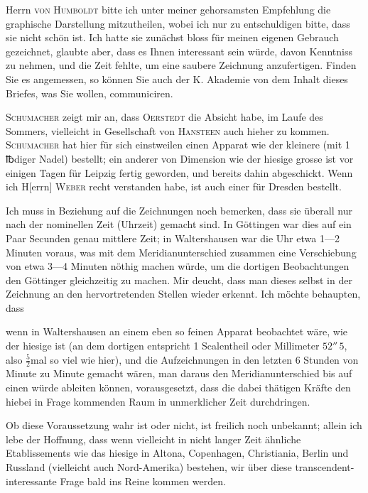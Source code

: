 Herrn \textsc{von Humboldt} bitte ich unter meiner gehorsamsten Empfehlung
die graphische Darstellung mitzutheilen, wobei ich nur zu entschuldigen bitte,
dass sie nicht schön ist. Ich hatte sie zunächst bloss für meinen eigenen Gebrauch
gezeichnet, glaubte aber, dass es Ihnen interessant sein würde, davon
\clearpage{}\HistoricalFoot{}{12\textsuperscript{*}}
\noindent Kenntniss zu nehmen, und die Zeit fehlte, um eine saubere Zeichnung anzufertigen.
Finden Sie es angemessen, so können Sie auch der K. Akademie
von dem Inhalt dieses Briefes, was Sie wollen, communiciren.

\textsc{Schumacher} zeigt mir an, dass \textsc{Oerstedt} die Absicht habe, im Laufe des
Sommers, vielleicht in Gesellschaft von \textsc{Hansteen} auch hieher zu kommen.
\textsc{Schumacher} hat hier für sich einstweilen einen Apparat wie der kleinere
(mit 1 {℔}diger Nadel) bestellt; ein anderer von  Dimension wie
der hiesige grosse ist vor einigen Tagen für Leipzig fertig geworden, und bereits
dahin abgeschickt. Wenn ich H[errn] \textsc{Weber} recht verstanden habe, ist
auch einer für Dresden bestellt.

Ich muss in Beziehung auf die Zeichnungen noch bemerken, dass sie
überall nur nach der nominellen Zeit (Uhrzeit) gemacht sind. In Göttingen
war dies auf ein Paar Secunden genau mittlere Zeit; in Waltershausen war
die Uhr etwa 1—2 Minuten voraus, was mit dem Meridianunterschied zusammen
eine Verschiebung von etwa 3—4 Minuten nöthig machen würde, um die
dortigen Beobachtungen den Göttinger gleichzeitig zu machen. Mir deucht,
dass man dieses selbst in der Zeichnung an den hervortretenden Stellen wieder
erkennt. Ich möchte behaupten, dass
\begin{list}{}{\setlength{\leftmargin}{\parindent}\setlength{\rightmargin}{0pt}\setlength{\topsep}{0pt}\setlength{\partopsep}{0pt}}
\item[] wenn in Waltershausen an einem eben so feinen Apparat beobachtet
wäre, wie der hiesige ist (an dem dortigen entspricht 1 Scalentheil oder
Millimeter \(52''\,5\), also \(\frac{5}{2}\)mal so viel wie hier), und die Aufzeichnungen in
den letzten 6 Stunden von Minute zu Minute gemacht wären, man daraus
den Meridianunterschied bis auf einen 
würde ableiten können, vorausgesetzt, dass die dabei thätigen
Kräfte den hiebei in Frage kommenden Raum in unmerklicher Zeit
durchdringen.
\end{list}
\noindent\hspace*{\parindent}Ob diese Voraussetzung wahr ist oder nicht, ist freilich noch unbekannt;
allein ich lebe der Hoffnung, dass wenn vielleicht in nicht langer Zeit ähnliche
Etablissements wie das hiesige in Altona, Copenhagen, Christiania, Berlin
und Russland (vielleicht auch Nord-Amerika) bestehen, wir über diese transcendent-interessante
Frage bald ins Reine kommen werden.

